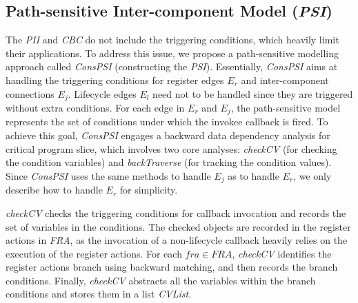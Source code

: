 
\subsection{Path-sensitive Inter-component Model (\textit{PSI})} 
The \textit{PII} and \textit{CBC} do not include the triggering conditions, which heavily limit their applications. To address this issue, we propose a path-sensitive modelling approach called \textit{ConsPSI} (constructing the \textit{PSI}). Essentially, \textit{ConsPSI} aims at handling the triggering conditions for register edges $E_{r}$ and inter-component connections $E_{j}$. Lifecycle edges $E_{l}$ need not to be handled since they are triggered without extra conditions. For each edge in $E_{r}$ and $E_{j}$, the path-sensitive model represents the set of conditions under which the invokee callback is fired. To achieve this goal, \textit{ConsPSI} engages a backward data dependency analysis for critical program slice, which involves two core analyses: \textit{checkCV} (for checking the condition variables) and \textit{backTraverse} (for tracking the condition values). Since \textit{ConsPSI} uses the same methods to handle $E_{j}$ as to handle $E_{r}$, we only describe how to handle $E_{r}$ for simplicity.

\textit{checkCV} checks the triggering conditions for callback invocation and records the set of variables in the conditions. The checked objects are recorded in the register actions in \textit{FRA}, as the invocation of a non-lifecycle callback heavily relies on the execution of the register actions. For each $\mathit{fra}\in \mathit{FRA}$, \textit{checkCV} identifies the register actions branch using backward matching, and then records the branch conditions. Finally, \textit{checkCV} abstracts all the variables within the branch conditions and stores them in a list \textit{CVList}.

